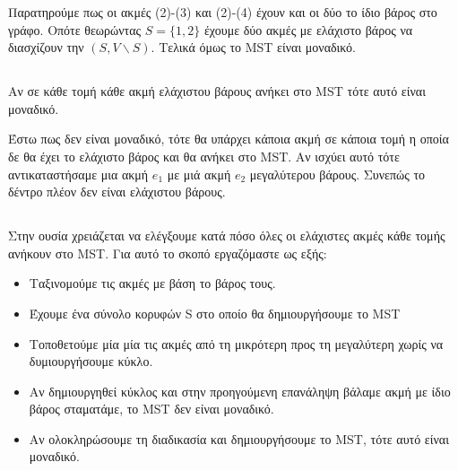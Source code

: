 \documentclass[a4paper,10pt]{article}
\begin{document}
\begin{figure}[ht]
	\centering
	\hspace{1cm}
\end{figure}

Παρατηρούμε πως οι ακμές (2)-(3) και (2)-(4) έχουν και οι δύο το ίδιο βάρος
στο γράφο. Οπότε θεωρώντας $S=\{1,2\}$ έχουμε δύο ακμές με ελάχιστο βάρος να
διασχίζουν την $(S, V \backslash S)$. Τελικά όμως το MST είναι μοναδικό.

\subsection{}
Αν σε κάθε τομή κάθε ακμή ελάχιστου βάρους ανήκει στο MST τότε αυτό είναι μοναδικό.

Έστω πως δεν είναι μοναδικό, τότε θα υπάρχει κάποια ακμή σε κάποια τομή η
οποία δε θα έχει το ελάχιστο βάρος και θα ανήκει στο MST. Αν ισχύει αυτό τότε
αντικαταστήσαμε μια ακμή $e_1$ με μιά ακμή $e_2$ μεγαλύτερου βάρους. Συνεπώς
το δέντρο πλέον δεν είναι ελάχιστου βάρους.

\subsection{}
Στην ουσία χρειάζεται να ελέγξουμε κατά πόσο όλες οι ελάχιστες ακμές κάθε
τομής ανήκουν στο MST. Για αυτό το σκοπό εργαζόμαστε ως εξής:
\begin{itemize}
	\item Ταξινομούμε τις ακμές με βάση το βάρος τους.
	\item Έχουμε ένα σύνολο κορυφών S στο οποίο θα δημιουργήσουμε το MST
	\item Τοποθετούμε μία μία τις ακμές από τη μικρότερη προς τη μεγαλύτερη
		χωρίς να δυμιουργήσουμε κύκλο.
	\item Αν δημιουργηθεί κύκλος και στην προηγούμενη επανάληψη βάλαμε ακμή με
		ίδιο βάρος σταματάμε, το MST δεν είναι μοναδικό.
	\item Αν ολοκληρώσουμε τη διαδικασία και δημιουργήσουμε το MST, τότε αυτό είναι
		μοναδικό.
\end{itemize}
\end{document}

